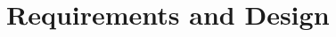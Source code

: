 \documentclass[finalReport.tex]{subfiles}
\begin{document}
\chapter{Requirements and Design}
\end{document}
